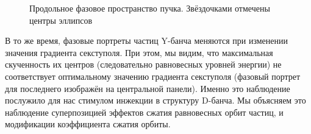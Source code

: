 \begin{figure}[H]
	\centering
	\caption[Продольное фазовое пространство пучка. 
	Звёздочками отмечены центры эллипсов]{Продольное фазовое пространство пучка. 
		Звёздочками отмечены центры эллипсов\label{fig:long_PS_sext_settings}}
\end{figure}

В то же время, фазовые портреты частиц Y-банча меняются при изменении значения градиента секступоля. 
При этом, мы видим, что максимальная скученность их центров (следовательно равновесных уровней энергии) 
не соответствует оптимальному значению градиента секступоля (фазовый портрет для последнего изображён 
на центральной панели). Именно это наблюдение послужило для нас стимулом инжекции в структуру D-банча. 
Мы объясняем это наблюдение суперпозицией эффектов сжатия равновесных орбит частиц, 
и модификации коэффициента сжатия орбиты.

